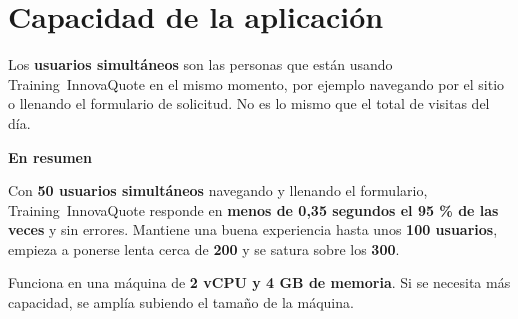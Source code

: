 \chapter{Capacidad de la aplicación}\label{cap:capacidad}


Los \textbf{usuarios simultáneos} son las personas que están usando Training~InnovaQuote en el mismo
momento, por ejemplo navegando por el sitio o llenando el formulario de solicitud. No es lo
mismo que el total de visitas del día.

\begin{tcolorbox}[enhanced, colback=nube, colframe=nube, arc=6pt, left=16pt, right=16pt,
    top=13pt, bottom=13pt, before skip=12pt, after skip=14pt, borderline west={3.5pt}{0pt}{azul}]
  {\montserrat\bfseries\color{azul}{\iconos\char"F0C0\relax}\hspace{0.55em}En resumen}\par\vspace{5pt}
  Con \textbf{50 usuarios simultáneos} navegando y llenando el formulario, Training~InnovaQuote responde en
  \textbf{menos de 0,35 segundos el 95 \% de las veces} y sin errores. Mantiene una buena
  experiencia hasta unos \textbf{100 usuarios}, empieza a ponerse lenta cerca de \textbf{200} y se
  satura sobre los \textbf{300}.

  \vspace{4pt}
  Funciona en una máquina de \textbf{2 vCPU y 4 GB de memoria}. Si se necesita más capacidad, se
  amplía subiendo el tamaño de la máquina.
\end{tcolorbox}

